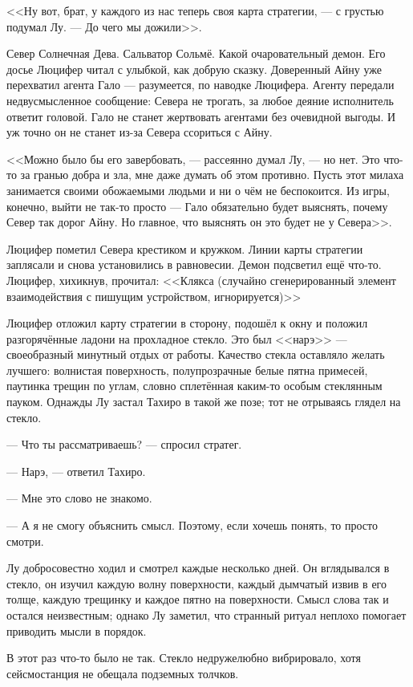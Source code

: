<<Ну вот, брат, у каждого из нас теперь своя карта стратегии, --- с грустью подумал Лу.
--- До чего мы дожили>>.

Север Солнечная Дева.
Сальватор Сольмё.
Какой очаровательный демон.
Его досье Люцифер читал с улыбкой, как добрую сказку.
Доверенный Айну уже перехватил агента Гало --- разумеется, по наводке Люцифера.
Агенту передали недвусмысленное сообщение: Севера не трогать, за любое деяние исполнитель ответит головой.
Гало не станет жертвовать агентами без очевидной выгоды.
И уж точно он не станет из-за Севера ссориться с Айну.

<<Можно было бы его завербовать, --- рассеянно думал Лу, --- но нет.
Это что-то за гранью добра и зла, мне даже думать об этом противно.
Пусть этот милаха занимается своими обожаемыми людьми и ни о чём не беспокоится.
Из игры, конечно, выйти не так-то просто --- Гало обязательно будет выяснять, почему Север так дорог Айну.
Но главное, что выяснять он это будет не у Севера>>.

Люцифер пометил Севера крестиком и кружком.
Линии карты стратегии заплясали и снова установились в равновесии.
Демон подсветил ещё что-то.
Люцифер, хихикнув, прочитал:
<<Клякса (случайно сгенерированный элемент взаимодействия с пишущим устройством, игнорируется)>>

Люцифер отложил карту стратегии в сторону, подошёл к окну и положил разгорячённые ладони на прохладное стекло.
Это был <<нарэ>> --- своеобразный минутный отдых от работы.
Качество стекла оставляло желать лучшего: волнистая поверхность, полупрозрачные белые пятна примесей, паутинка трещин по углам, словно сплетённая каким-то особым стеклянным пауком.
Однажды Лу застал Тахиро в такой же позе;
тот не отрываясь глядел на стекло.

--- Что ты рассматриваешь? --- спросил стратег.

--- Нарэ, --- ответил Тахиро.

--- Мне это слово не знакомо.

--- А я не смогу объяснить смысл.
Поэтому, если хочешь понять, то просто смотри.

Лу добросовестно ходил и смотрел каждые несколько дней.
Он вглядывался в стекло, он изучил каждую волну поверхности, каждый дымчатый извив в его толще, каждую трещинку и каждое пятно на поверхности.
Смысл слова так и остался неизвестным;
однако Лу заметил, что странный ритуал неплохо помогает приводить мысли в порядок.

В этот раз что-то было не так.
Стекло недружелюбно вибрировало, хотя сейсмостанция не обещала подземных толчков.

